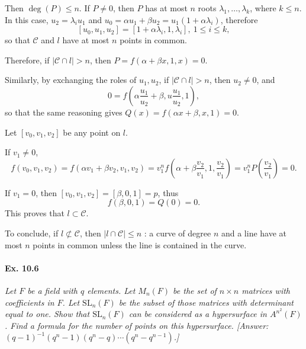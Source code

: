 \documentclass[11pt,a4paper]{article}
\begin{document}
Then $\deg(P) \leq n$. If $P \ne 0$, then $P$ has at most $n$ roots $\lambda_1,\ldots,\lambda_k$, where $k\leq n$. In this case, $u_2 = \lambda_i u_1$ and $u_0  =\alpha u_1 + \beta u_2 = u_1\left(1 +\alpha \lambda_i\right)$, therefore
$$[u_0,u_1,u_2]  =\left [1 +\alpha \lambda_i, 1 , \lambda_i \right],\ 1\leq i \leq k,$$ 
so that $\mathscr{C}$ and $l$ have at most $n$ points in common.

Therefore, if $|\mathscr {C} \cap l| >n$, then $P =  f\left(\alpha + \beta x,1,x\right) = 0$.

Similarly, by exchanging the roles of $u_1,u_2$, if $|\mathscr {C} \cap l| >n$, then $u_2 \ne 0$, and
$$0 = f\left (\alpha \frac{u_1}{u_2} + \beta, u\frac{u_1}{u_2}, 1\right ),$$
so that the same reasoning gives $Q(x) = f(\alpha x + \beta, x ,1) = 0$.

 Let $[v_0,v_1,v_2]$ be any point on $l$. 
 
 If $v_1 \ne 0$,
$$f(v_0,v_1,v_2) = f(\alpha v_1 + \beta v_2, v_1,v_2) = v_1^n f\left(\alpha + \beta \frac{v_2}{v_1}, 1 ,\frac{v_2}{v_1}\right) = v_1^n P\left (\frac{v_2}{v_1} \right) = 0.$$

If $v_1 = 0$, then $[v_0,v_1,v_2] = [\beta, 0,1] = p$, thus
$$f(\beta,0,1) = Q(0) =0.$$
This proves that $l \subset \mathscr{C}$.

To conclude, if $l \not \subset \mathscr {C}$, then $|l \cap \mathscr{C}| \leq n$ : a curve of degree $n$ and a line have at most $n$ points in common unless the line is contained in the curve.

\paragraph{Ex. 10.6} {\it Let $F$ be a field with $q$ elements. Let $M_n(F)$ be the set of $n \times n$ matrices with coefficients in $F$. Let $\mathrm{SL}_n(F)$ be the subset of those matrices with determinant equal to one. Show that $\mathrm{SL}_n(F)$ can be considered as a hypersurface in $A^{n^2}(F)$. Find a formula for the number of points on this hypersurface. [Answer:$(q-1)^{-1}(q^n-1)(q^n-q)\cdots(q^n-q^{n-1})$.]
}
\end{document}
